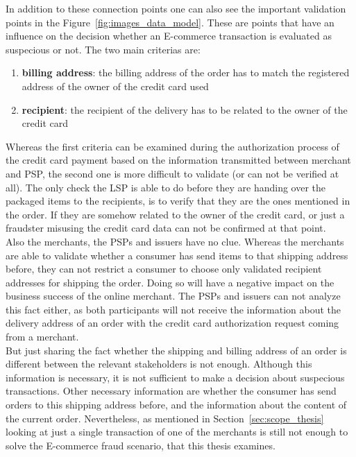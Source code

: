 In addition to these connection points one can also see the important validation points in the Figure~\ref{fig:images_data_model}. These are points that have an influence on the decision whether an \gls{E-commerce} transaction is evaluated as suspecious or not. The two main criterias are: \@

\begin{enumerate}
  \item \textbf{billing address}: the billing address of the order has to match the registered address of the owner of the credit card used
  \item \textbf{recipient}: the recipient of the delivery has to be related to the owner of the credit card
\end{enumerate}


Whereas the first criteria can be examined during the authorization process of the credit card payment based on the information transmitted between merchant and \gls{PSP}, the second one is more difficult to validate (or can not be verified at all). The only check the \gls{LSP} is able to do before they are handing over the packaged items to the recipients, is to verify that they are the ones mentioned in the order. If they are somehow related to the owner of the credit card, or just a fraudster misusing the credit card data can not be confirmed at that point. \\

Also the merchants, the \gls{PSP}s and issuers have no clue. Whereas the merchants are able to validate whether a consumer has send items to that shipping address before, they can not restrict a consumer to choose only validated recipient addresses for shipping the order. Doing so will have a negative impact on the business success of the online merchant. The \gls{PSP}s and issuers can not analyze this fact either, as both participants will not receive the information about the delivery address of an order with the credit card authorization request coming from a merchant. \\

But just sharing the fact whether the shipping and billing address of an order is different between the relevant stakeholders is not enough. Although this information is necessary, it is not sufficient to make a decision about suspecious transactions. Other necessary information are whether the consumer has send orders to this shipping address before, and the information about the content of the current order. Nevertheless, as mentioned in Section~\ref{sec:scope_thesis} looking at just a single transaction of one of the merchants is still not enough to solve the \gls{E-commerce} fraud scenario, that this thesis examines. \\

